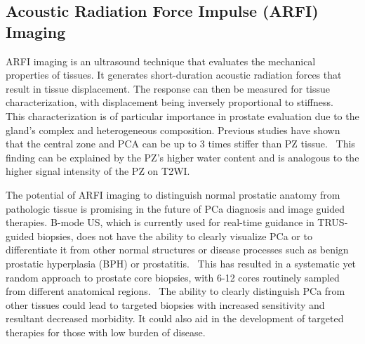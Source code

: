 \subsection{Acoustic Radiation Force Impulse (ARFI) Imaging}
ARFI imaging is an ultrasound technique that evaluates the mechanical
properties of tissues. It generates short-duration acoustic radiation forces
that result in tissue displacement. The response can then be measured for
tissue characterization, with displacement being inversely proportional to
stiffness.~\cite{Nightingale2002} This characterization is of particular
importance in prostate evaluation due to the gland’s complex and heterogeneous
composition.  Previous studies have shown that the central zone and PCA can be
up to 3 times stiffer than PZ tissue.~\cite{Zhai2010a,Zhai2012,Zhai2010b} This
finding can be explained by the PZ’s higher water content and is analogous to
the higher signal intensity of the PZ on T2WI.

The potential of ARFI imaging to distinguish normal prostatic anatomy from
pathologic tissue is promising in the future of PCa diagnosis and image guided
therapies. B-mode US, which is currently used for real-time guidance in
TRUS-guided biopsies, does not have the ability to clearly visualize PCa or to
differentiate it from other normal structures or disease processes such as
benign prostatic hyperplasia (BPH) or prostatitis.~\cite{Zhai2010a} This has
resulted in a systematic yet random approach to prostate core biopsies, with
6-12 cores routinely sampled from different anatomical regions.~\cite{Loch2004}
The ability to clearly distinguish PCa from other tissues could lead to
targeted biopsies with increased sensitivity and resultant decreased morbidity.
It could also aid in the development of targeted therapies for those with low
burden of disease. 
